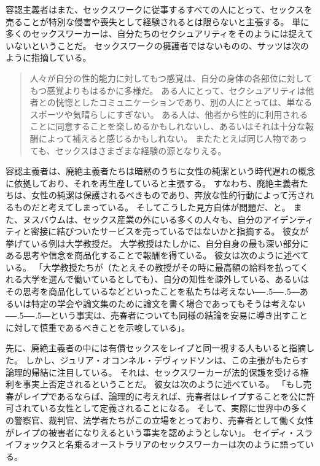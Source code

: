 \documentclass[paper=a4,book,openany]{jlreq}
\def\DDASH{―\kern-.5\zw―\kern-.5\zw―} %
\begin{document}
容認主義者はまた、セックスワークに従事するすべての人にとって、セックスを売ることが特別な侵害や喪失として経験されるとは限らないと主張する。
単に多くのセックスワーカーは、自分たちのセクシュアリティをそのようには捉えていないということだ。
セックスワークの擁護者ではないものの、サッツは次のように指摘している。

\begin{quote}
人々が自分の性的能力に対してもつ感覚は、自分の身体の各部位に対してもつ感覚よりもはるかに多様だ。
ある人にとって、セクシュアリティは他者との恍惚としたコミュニケーションであり、別の人にとっては、単なるスポーツや気晴らしにすぎない。
ある人は、他者から性的に利用されることに同意することを楽しめるかもしれないし、あるいはそれは十分な報酬によって補えると感じるかもしれない。
またたとえば同じ人物であっても、セックスはさまざまな経験の源となりえる。
\citep[p.71]{satz95:_market_women_sexual_labor}
\end{quote}

容認主義者は、廃絶主義者たちは暗黙のうちに女性の純潔という時代遅れの概念に依拠しており、それを再生産していると主張する。
すなわち、廃絶主義者たちは、女性の純潔は保護されるべきものであり、奔放な性的行動によって汚されるものだと考えてしまっている。
そしてこうした見方自体が問題だ、と。
また、ヌスバウムは、セックス産業の外にいる多くの人々も、自分のアイデンティティと密接に結びついたサービスを売っているではないかと指摘する。
彼女が挙げている例は大学教授だ。
大学教授はたしかに、自分自身の最も深い部分にある思考や信念を商品化することで報酬を得ている。
彼女は次のように述べている。
「大学教授たちが（たとえその教授がその時に最高額の給料を払ってくれる大学を選んで働いているとしても）、自分の知性を疎外している、あるいはその思考を商品化しているなどといったことを私たちは考えない{\DDASH}あるいは特定の学会や論文集のために論文を書く場合であってもそうは考えない{\DDASH}という事実は、売春者についても同様の結論を安易に導き出すことに対して慎重であるべきことを示唆している」\citep[p.704]{nussbaum98:_wheth_reason_prejud}。

先に、廃絶主義者の中には有償セックスをレイプと同一視する人もいると指摘した。
しかし、ジュリア・オコンネル・デヴィッドソンは、この主張がもたらす論理的帰結に注目している。
それは、セックスワーカーが法的保護を受ける権利を事実上否定されるということだ。
彼女は次のように述べている。
「もし売春がレイプであるならば、論理的に考えれば、売春者はレイプすることを公に許可されている女性として定義されることになる。
そして、実際に世界中の多くの警察官、裁判官、法学者たちがこの立場をとっており、売春者として働く女性がレイプの被害者になりえるという事実を認めようとしない」\citep[p.122]{davidson98:_prost_power_freed}。
セイディ・スライフォックスと名乗るオーストラリアのセックスワーカーは次のように語っている。
\end{document}
